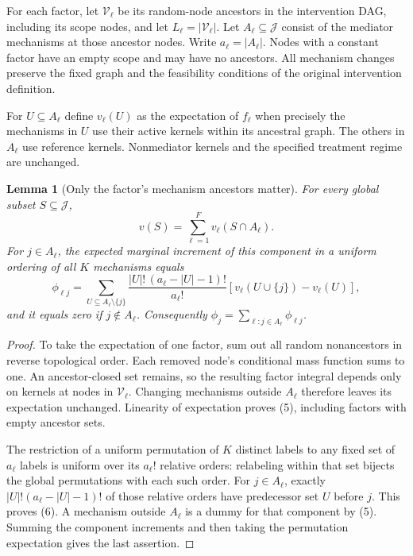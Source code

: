 \documentclass[11pt]{article}
\newtheorem{lemma}[theorem]{Lemma}
\theoremstyle{definition}
\begin{document}
For each factor, let $\mathcal V_\ell$ be its random-node ancestors in
the intervention DAG, including its scope nodes, and let
$L_\ell=|\mathcal V_\ell|$. Let $A_\ell\subseteq\mathcal J$ consist
of the mediator mechanisms at those ancestor nodes. Write
$a_\ell=|A_\ell|$. Nodes with a constant factor have an empty scope and
may have no ancestors. All mechanism changes preserve the fixed graph
and the feasibility conditions of the original intervention definition.

For $U\subseteq A_\ell$ define $v_\ell(U)$ as the expectation of
$f_\ell$ when precisely the mechanisms in $U$ use their active kernels
within its ancestral graph. The others in $A_\ell$ use reference kernels.
Nonmediator kernels and the specified treatment regime are unchanged.

\begin{lemma}[Only the factor's mechanism ancestors matter]
For every global subset $S\subseteq\mathcal J$,
\[
 v(S)=\sum_{\ell=1}^F v_\ell(S\cap A_\ell).           \tag{5}
\]
For $j\in A_\ell$, the expected marginal increment of this component
in a uniform ordering of all $K$ mechanisms equals
\[
 \phi_{\ell j}=
 \sum_{U\subseteq A_\ell\setminus\{j\}}
  \frac{|U|!\,(a_\ell-|U|-1)!}{a_\ell!}
            [v_\ell(U\cup\{j\})-v_\ell(U)],          \tag{6}
\]
and it equals zero if $j\notin A_\ell$.
Consequently $\phi_j=\sum_{\ell:j\in A_\ell}\phi_{\ell j}$.
\end{lemma}
\begin{proof}
To take the expectation of one factor, sum out all random nonancestors
in reverse topological order. Each removed node's conditional mass
function sums to one. An ancestor-closed set remains, so the resulting
factor integral depends only on kernels at nodes in $\mathcal V_\ell$.
Changing mechanisms outside $A_\ell$ therefore leaves its expectation
unchanged. Linearity of expectation proves (5), including factors with
empty ancestor sets.

The restriction of a uniform permutation of $K$ distinct labels to any
fixed set of $a_\ell$ labels is uniform over its $a_\ell!$ relative
orders: relabeling within that set bijects the global permutations with
each such order. For $j\in A_\ell$, exactly
$|U|!(a_\ell-|U|-1)!$ of those relative orders have predecessor set
$U$ before $j$. This proves (6). A mechanism outside $A_\ell$ is a
dummy for that component by (5). Summing the component increments and
then taking the permutation expectation gives the last assertion.
\end{proof}
\end{document}
